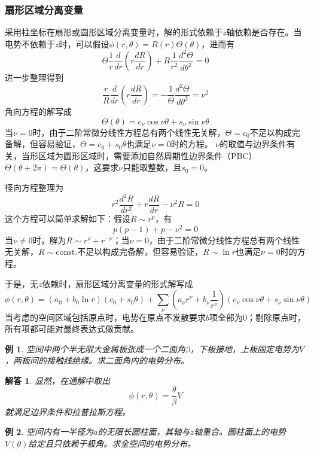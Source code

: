 \documentclass[a4paper,11pt]{ctexbook}
\newtheorem{eg}{例}[section]
\newtheorem{ans}{解答}[section]
\newcommand{\beq}{\begin{equation}}
\newcommand{\eeq}{\end{equation}}
\begin{document}
\subsubsection{扇形区域分离变量}
采用柱坐标在扇形或圆形区域分离变量时，解的形式依赖于$z$轴依赖是否存在。当电势不依赖于$z$时，可以假设$\phi(r,\theta) = R(r) \Theta(\theta)$，进而有
\beq
\Theta \frac{1}{r} \frac{d}{dr} \left( r \frac{dR}{dr}\right) + R \frac{1}{r^2} \frac{d^2 \Theta}{d \theta^2} = 0
\eeq
进一步整理得到
\beq
\frac{r}{R} \frac{d}{dr} \left( r \frac{dR}{dr} \right) = - \frac{1}{\Theta} \frac{d^2 \Theta}{d \theta^2} = \nu^2
\eeq
角向方程的解写成
\beq
\Theta(\theta) = c_\nu \cos \nu \theta + s_\nu \sin \nu \theta
\eeq
当$\nu=0$时，由于二阶常微分线性方程总有两个线性无关解，$\Theta = c_0$不足以构成完备解，但容易验证，$\Theta = c_0 + s_0 \theta$也满足$\nu=0$时的方程。
$\nu$的取值与边界条件有关，当形区域为圆形区域时，需要添加自然周期性边界条件（PBC）$\Theta(\theta + 2\pi) = \Theta(\theta)$，这要求$\nu$只能取整数，且$s_0=0$。
\par
径向方程整理为
\beq
r^2 \frac{d^2 R}{dr^2} + r \frac{dR}{dr} - \nu^2 R = 0
\eeq
这个方程可以简单求解如下：假设$R \sim r^p$，有
\beq
p(p-1) + p - \nu^2 = 0
\eeq
当$\nu \not= 0$时，解为$R \sim r^\nu + r^{-\nu}$；当$\nu=0$，由于二阶常微分线性方程总有两个线性无关解，$R \sim \mathrm{const.}$不足以构成完备解，但容易验证，$R \sim \ln r$也满足$\nu=0$时的方程。
\par
于是，无$z$依赖时，扇形区域分离变量的形式解写成
\beq
\phi(r,\theta) = (a_0 + b_0 \ln r)(c_0 + s_0 \theta) + \sum_{\nu} \left(a_\nu r^\nu + b_\nu \frac{1}{r^\nu} \right) \left( c_\nu \cos \nu \theta + s_\nu \sin \nu \theta \right)
\eeq
当考虑的空间区域包括原点时，电势在原点不发散要求$b$项全部为0；剔除原点时，所有项都可能对最终表达式做贡献。
\begin{eg}
空间中两个半无限大金属板张成一个二面角$\beta$，下板接地，上板固定电势为$V$，两板间的接触线绝缘。求二面角内的电势分布。
\end{eg}
\begin{ans}
显然，在通解中取出
\beq
\phi(r,\theta) = \frac{\theta}{\beta} V
\eeq
就满足边界条件和拉普拉斯方程。
\end{ans}
\begin{eg}
空间内有一半径为$a$的无限长圆柱面，其轴与$z$轴重合。圆柱面上的电势$V(\theta)$给定且只依赖于极角。求全空间的电势分布。
\end{eg}
\end{document}

